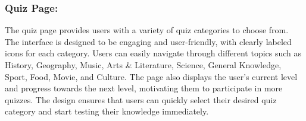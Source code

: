 \subsubsection{Quiz Page: }

The quiz page provides users with a variety of quiz categories to choose from. The interface is designed to be engaging and user-friendly, with clearly labeled icons for each category. Users can easily navigate through different topics such as History, Geography, Music, Arts \& Literature, Science, General Knowledge, Sport, Food, Movie, and Culture. The page also displays the user's current level and progress towards the next level, motivating them to participate in more quizzes. The design ensures that users can quickly select their desired quiz category and start testing their knowledge immediately.

